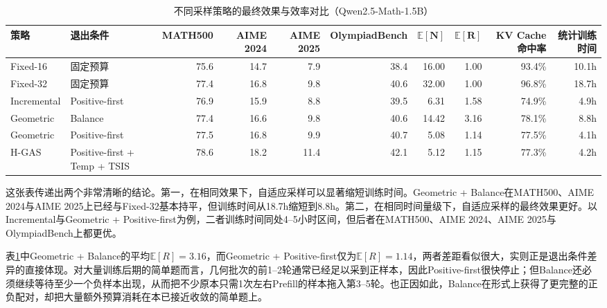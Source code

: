 \begin{table}[htbp]
    \centering
    \caption{不同采样策略的最终效果与效率对比（Qwen2.5-Math-1.5B）}\label{tab:exp_sampling_overall}
    \small
    \setlength{\tabcolsep}{3.2pt}
    \renewcommand{\arraystretch}{1.15}
    \begin{tabular}{|l|l|r|r|r|r|r|r|r|r|}
    \hline
    \textbf{策略} & \textbf{退出条件} & \textbf{MATH500} & \textbf{AIME 2024} & \textbf{AIME 2025} & \textbf{OlympiadBench} & $\boldsymbol{\mathbb{E}[N]}$ & $\boldsymbol{\mathbb{E}[R]}$ & \textbf{KV Cache命中率} & \textbf{统计训练时间} \\
    \hline
    Fixed-16    & 固定预算                       & 75.6 & 14.7 & 7.9  & 38.4 & 16.00 & 1.00 & 93.4\% & 10.1h \\
    Fixed-32    & 固定预算                       & 77.4 & 16.8 & 9.8  & 40.6 & 32.00 & 1.00 & 96.8\% & 18.7h \\
    Incremental & Positive-first                & 76.9 & 15.9 & 8.8  & 39.5 & 6.31  & 1.58 & 74.9\% & 4.9h \\
    Geometric   & Balance                       & 77.4 & 16.6 & 9.8  & 40.6 & 14.42 & 3.16 & 78.1\% & 8.8h \\
    Geometric   & Positive-first                & 77.5 & 16.8 & 9.9  & 40.7 & 5.08  & 1.14 & 77.5\% & 4.1h \\
    H-GAS       & Positive-first + Temp + TSIS  & 78.6 & 18.2 & 11.4 & 42.1 & 5.12  & 1.15 & 77.3\% & 4.2h \\
    \hline
    \end{tabular}
\end{table}

这张表传递出两个非常清晰的结论。第一，在相同效果下，自适应采样可以显著缩短训练时间。Geometric + Balance在MATH500、AIME 2024与AIME 2025上已经与Fixed-32基本持平，但训练时间从18.7h缩短到8.8h。第二，在相同时间量级下，自适应采样的最终效果更好。以Incremental与Geometric + Positive-first为例，二者训练时间同处4--5小时区间，但后者在MATH500、AIME 2024、AIME 2025与OlympiadBench上都更优。

表\ref{tab:exp_sampling_overall}中Geometric + Balance的平均$\mathbb{E}[R]=3.16$，而Geometric + Positive-first仅为$\mathbb{E}[R]=1.14$，两者差距看似很大，实则正是退出条件差异的直接体现。对大量训练后期的简单题而言，几何批次的前1--2轮通常已经足以采到正样本，因此Positive-first很快停止；但Balance还必须继续等待至少一个负样本出现，从而把不少原本只需1次左右Prefill的样本拖入第3--5轮。也正因如此，Balance在形式上获得了更完整的正负配对，却把大量额外预算消耗在本已接近收敛的简单题上。

